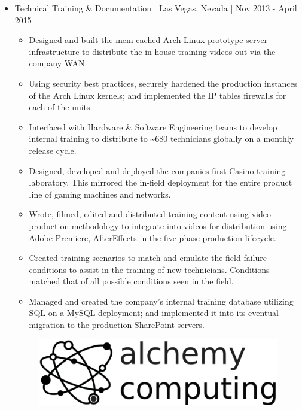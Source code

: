 \documentclass[letter,10pt]{article}
\begin{document}
\begin{itemize}
\item Technical Training \& Documentation | Las Vegas, Nevada | Nov 2013 - April 2015
\label{sec:org36eeb05}
\begin{itemize}
\item Designed and built the mem-cached Arch Linux prototype server infrastructure to distribute the in-house training videos out via the company WAN.
\item Using security best practices, securely hardened the production instances of the Arch Linux kernels; and implemented the IP tables firewalls for each of the units.
\item Interfaced with Hardware \& Software Engineering teams to develop internal training to distribute to \textasciitilde{}680 technicians globally on a monthly release cycle.
\item Designed, developed and deployed the companies first Casino training laboratory. This mirrored the in-field deployment for the entire product line of gaming machines and networks.
\item Wrote, filmed, edited and distributed training content using video production methodology to integrate into videos for distribution using Adobe Premiere, AfterEffects in the five phase production lifecycle.
\item Created training scenarios to match and emulate the field failure conditions to assist in the training of new technicians. Conditions matched that of all possible conditions seen in the field.
\item Managed and created the company’s internal training database utilizing SQL on a MySQL deployment; and implemented it into its eventual migration to the production SharePoint servers.
\end{itemize}



\begin{figure}
\includegraphics[width=0.8\linewidth]{./img/50p_alchemy_computing.jpg}
\end{figure}
\end{itemize}
\end{document}
